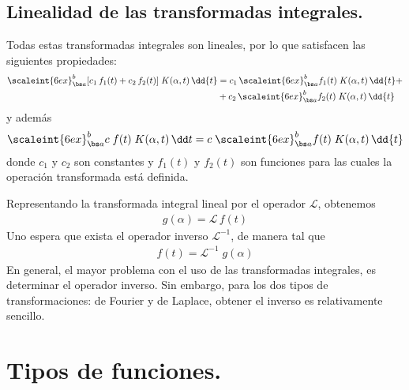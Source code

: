 \subsection{Linealidad de las transformadas integrales.}

Todas estas transformadas integrales son lineales, por lo que satisfacen las siguientes propiedades:
\begin{align}
\begin{aligned}
\scaleint{6ex}_{\bs a}^{b} [ c_{1} \, f_{1} (t) + c_{2} \, f_{2} (t)] \; K(\alpha, t) \, \dd{t} &= c_{1} \, \scaleint{6ex}_{\bs a}^{b} f_{1} (t) \; K (\alpha, t) \, \dd{t} + \\
&+ c_{2} \, \scaleint{6ex}_{\bs a}^{b} f_{2} (t) \; K (\alpha, t) \, \dd{t}
\end{aligned}
\label{eq:ecuacion_15_08} 
\end{align}
y además
\begin{align}
\scaleint{6ex}_{\bs a}^{b}  c \; f (t) \; K (\alpha, t) \, \dd t =  c \; \scaleint{6ex}_{\bs a}^{b} f (t) \; K (\alpha, t) \, \dd{t}
\label{eq:ecuacion_15_09}
\end{align}
donde $c_{1}$ y $c_{2}$ son constantes y $f_{1} (t)$ y $f_{2} (t)$ son funciones para las cuales la operación transformada está definida.
\par
Representando la transformada integral lineal por el operador $\mathcal{L}$, obtenemos
\begin{align}
g (\alpha) = \mathcal{L} \, f (t)
\label{eq:ecuacion_15_10}
\end{align}
Uno espera que exista el operador inverso $\mathcal{L}^{-1}$, de manera tal que
\begin{align}
f (t) = \mathcal{L}^{-1}  \; g (\alpha)
\label{eq:ecuacion_15_11}
\end{align}
En general, el mayor problema con el uso de las transformadas integrales, es determinar el operador inverso. Sin embargo, para los dos tipos de transformaciones: de Fourier y de Laplace, obtener el inverso es relativamente sencillo.

\section{Tipos de funciones.}

